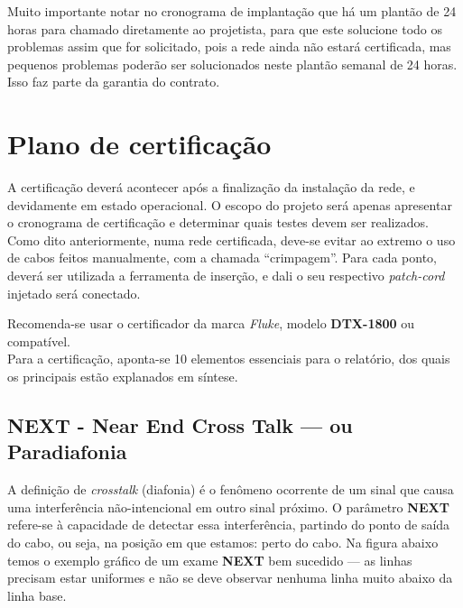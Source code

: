 \documentclass[	DIV=calc,%
							paper=a4,%
							fontsize=12pt,%
							onecolumn]{scrartcl}	 					%
\begin{document}
Muito importante notar no cronograma de implantação que há um plantão de 24 horas para chamado diretamente ao projetista, para que este solucione todo os problemas assim que for solicitado, pois a rede ainda não estará certificada, mas pequenos problemas poderão ser solucionados neste plantão semanal de 24 horas. Isso faz parte da garantia do contrato.


 


\section{Plano de certificação}

A certificação deverá acontecer após a finalização da instalação da rede, e devidamente em estado operacional. O escopo do projeto será apenas apresentar o cronograma de certificação e determinar quais testes devem ser realizados.
\\

Como dito anteriormente, numa rede certificada, deve-se evitar ao extremo o uso de cabos feitos manualmente, com a chamada ``crimpagem''. Para cada ponto, deverá ser utilizada a ferramenta de inserção, e dali o seu respectivo \textit{patch-cord} injetado será conectado.

Recomenda-se usar o certificador da marca \textit{Fluke}, modelo \textbf{DTX-1800 
}ou compatível.
\\

Para a certificação, aponta-se 10 elementos essenciais para o relatório, dos quais os principais estão explanados em síntese.
\\
\subsection{NEXT - Near End Cross Talk --- ou Paradiafonia}
A definição de \textit{crosstalk} (diafonia) é o fenômeno ocorrente de um sinal que causa uma interferência não-intencional em outro sinal próximo. O parâmetro \textbf{NEXT} refere-se à capacidade de detectar essa interferência, partindo do ponto de saída do cabo, ou seja, na posição em que estamos: perto do cabo. Na figura abaixo temos o exemplo gráfico de um exame \textbf{NEXT} bem sucedido --- as linhas precisam estar uniformes e não se deve observar nenhuma linha muito abaixo da linha base.
\end{document}

